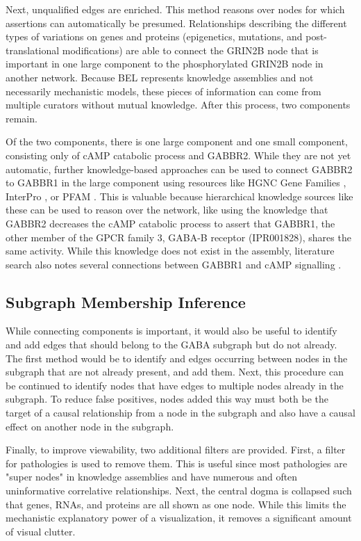Next, unqualified edges are enriched. This method reasons over nodes for which assertions can automatically be presumed. Relationships describing the different types of variations on genes and proteins (epigenetics, mutations, and post-translational modifications) are able to connect the GRIN2B node that is important in one large component to the phosphorylated GRIN2B node in another network. Because \ac{BEL} represents knowledge assemblies and not necessarily mechanistic models, these pieces of information can come from multiple curators without mutual knowledge. After this process, two components remain.

Of the two components, there is one large component and one small component, consisting only of cAMP catabolic process and GABBR2. While they are not yet automatic, further knowledge-based approaches can be used to connect GABBR2 to GABBR1 in the large component using resources like \ac{HGNC} Gene Families \cite{Gray2015}, InterPro \cite{Finn2017}, or PFAM \cite{Finn2016}. This is valuable because hierarchical knowledge sources like these can be used to reason over the network, like using the knowledge that GABBR2 decreases the cAMP catabolic process  \cite{Massone2011} to assert that GABBR1, the other member of the GPCR family 3, GABA-B receptor (IPR001828), shares the same activity. While this knowledge does not exist in the assembly, literature search also notes several connections between GABBR1 and cAMP signalling \cite{Frere2004,Palmer2005}.

\subsection{Subgraph Membership Inference}

While connecting components is important, it would also be useful to identify and add edges that should belong to the GABA subgraph but do not already. The first method would be to identify and edges occurring between nodes in the subgraph that are not already present, and add them. Next, this procedure can be continued to identify nodes that have edges to multiple nodes already in the subgraph. To reduce false positives, nodes added this way must both be the target of a causal relationship from a node in the subgraph and also have a causal effect on another node in the subgraph.

Finally, to improve viewability, two additional filters are provided. First, a filter for pathologies is used to remove them. This is useful since most pathologies are "super nodes" in knowledge assemblies and have numerous and often uninformative correlative relationships. Next, the central dogma is collapsed such that genes, \ac{RNA}s, and proteins are all shown as one node. While this limits the mechanistic explanatory power of a visualization, it removes a significant amount of visual clutter. 

